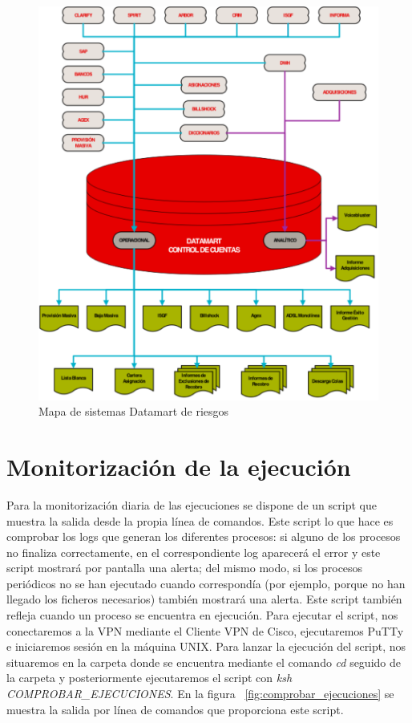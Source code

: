 \documentclass[a4paper, 12pt]{book}
\begin{document}
\begin{figure}
  \centering
  \includegraphics[width=15cm, keepaspectratio]{img/mapa_sistemas}
  \caption{Mapa de sistemas Datamart de riesgos}
  \label{fig:mapa_sistemas}
\end{figure}

\section{Monitorización de la ejecución} 
\label{sec:monitorizacion}
Para la monitorización diaria de las ejecuciones se dispone de un script que muestra la salida desde la propia línea de comandos. Este script lo que hace es comprobar los logs que generan los diferentes procesos: si alguno de los procesos no finaliza correctamente, en el correspondiente log aparecerá el error y este script mostrará por pantalla una alerta; del mismo modo, si los procesos periódicos no se han ejecutado cuando correspondía (por ejemplo, porque no han llegado los ficheros necesarios) también mostrará una alerta. Este script también refleja cuando un proceso se encuentra en ejecución.
Para ejecutar el script, nos conectaremos a la VPN mediante el Cliente VPN de Cisco, ejecutaremos PuTTy e iniciaremos sesión en la máquina UNIX. Para lanzar la ejecución del script, nos situaremos en la carpeta donde se encuentra mediante el comando \textit{cd} seguido de la carpeta y posteriormente ejecutaremos el script con \textit{ksh COMPROBAR\_EJECUCIONES}. En la figura ~\ref{fig:comprobar_ejecuciones} se muestra la salida por línea de comandos que proporciona este script.
\end{document}
